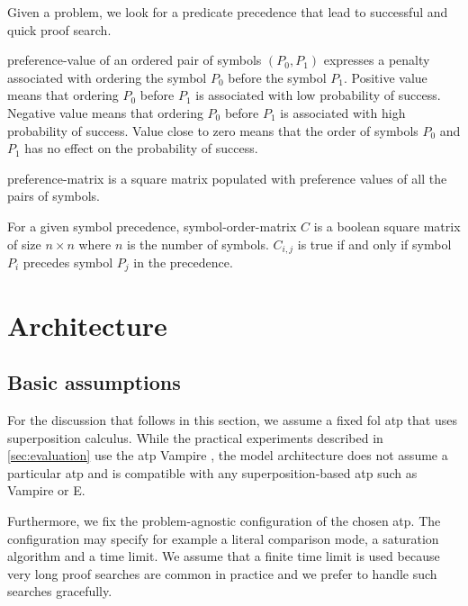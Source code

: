 Given a problem, we look for a predicate \gls{precedence} that lead to successful and quick proof search.

\Gls{preference-value} of an ordered pair of symbols \((P_0, P_1)\) expresses a penalty associated with ordering the symbol \(P_0\) before the symbol \(P_1\).
Positive value means that ordering \(P_0\) before \(P_1\) is associated with low probability of success.
Negative value means that ordering \(P_0\) before \(P_1\) is associated with high probability of success.
Value close to zero means that the order of symbols \(P_0\) and \(P_1\) has no effect on the probability of success.

\Gls{preference-matrix} is a square matrix populated with preference values of all the pairs of symbols.

For a given symbol precedence,
\gls{symbol-order-matrix} \(C\) is a boolean square matrix of size \(n \times n\) where \(n\) is the number of symbols.
\(C_{i, j}\) is true if and only if symbol \(P_i\) precedes symbol \(P_j\) in the precedence.

\section{Architecture}

\subsection{Basic assumptions}

For the discussion that follows in this section,
we assume a fixed \gls{fol} \gls{atp} that uses superposition calculus.
While the practical experiments described in \autoref{sec:evaluation} use the \gls{atp} Vampire \cite{?},
the model architecture does not assume a particular \gls{atp}
and is compatible with any superposition-based
\gls{atp} such as Vampire or E.

Furthermore, we fix the problem-agnostic configuration of the chosen \gls{atp}.
The configuration may specify for example a literal comparison mode, a saturation algorithm
and a time limit.
We assume that a finite time limit is used because very long proof searches are common in practice\cite{?}
and we prefer to handle such searches gracefully.

